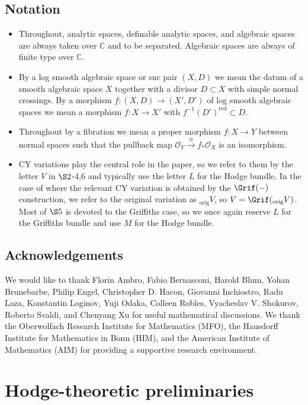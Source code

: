 \documentclass{amsart}
\theoremstyle{definition}
\theoremstyle{remark}
\def\bC{\mathbb{C}}
\def\cO{\mathcal{O}}
\def\reduced{\mathrm{red}}
\def\orig{\mathrm{orig}}
\numberwithin{equation}{section}
\begin{document}
\subsection*{Notation}
\begin{itemize}
\item Throughout, analytic spaces, definable analytic spaces, and algebraic spaces are always taken over $\bC$ and to be separated.  Algebraic spaces are always of finite type over $\bC$.
\item By a log smooth algebraic space or snc pair $(X,D)$ we mean the datum of a smooth algebraic space $X$ together with a divisor $D\subset X$ with simple normal crossings.  By a morphism $f:(X,D)\to (X',D')$ of log smooth algebraic spaces we mean a morphism $f:X\to X'$ with $ f^{-1}(D')^\reduced\subset D$.
\item Throughout by a fibration we mean a proper morphism $f:X\to Y$ between normal spaces such that the pullback map $\cO_Y\xrightarrow{\cong}f_*\cO_X$ is an isomorphism.
\item CY variations play the central role in the paper, so we refer to them by the letter $V$ in $\S2$-4,6 and typically use the letter $L$ for the Hodge bundle.  In the case of  where the relevant CY variation is obtained by the $\Grif(-)$ construction, we refer to the original variation as ${_\orig V}$, so $V=\Grif(_\orig V)$. Most of $\S5$ is devoted to the Griffiths case, so we once again reserve $L$ for the Griffiths bundle and use $M$ for the Hodge bundle. 
\end{itemize}

\subsection*{Acknowledgements} We would like to thank Florin Ambro, Fabio Bernasconi, Harold Blum, Yohan Brunebarbe, Philip Engel, Christopher D. Hacon, Giovanni Inchiostro, Radu Laza, Konstantin Loginov, Yuji Odaka, Colleen Robles, 
Vyacheslav V. Shokurov, Roberto Svaldi, and Chenyang Xu for useful mathematical discussions.
We thank the Oberwolfach Research Institute for Mathematics (MFO), the Hausdorff Institute for Mathematics in Bonn (HIM), and the American
Institute of Mathematics (AIM) for providing a supportive research environment. 

\def\Coh{\operatorname{Coh}}
\section{Hodge-theoretic preliminaries}
\end{document}
